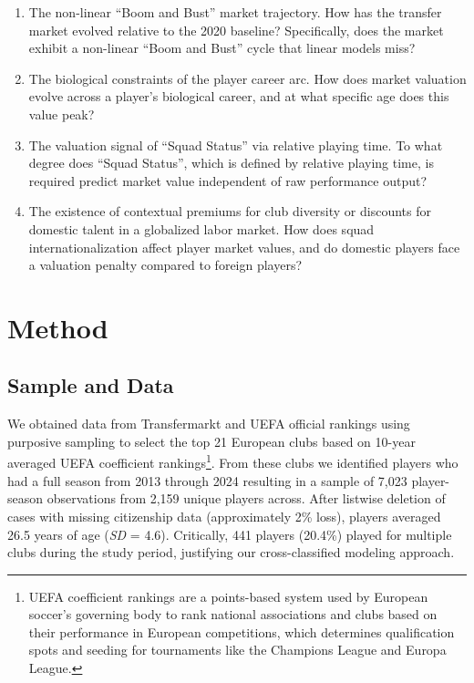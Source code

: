 \documentclass[
  12pt,
]{article}
\providecommand{\tightlist}{%
  \setlength{\itemsep}{0pt}\setlength{\parskip}{0pt}}\usepackage{longtable,booktabs,array}
\begin{document}
\begin{enumerate}
\def\labelenumi{\arabic{enumi}.}
\tightlist
\item
  The non-linear ``Boom and Bust'' market trajectory. How has the
  transfer market evolved relative to the 2020 baseline? Specifically,
  does the market exhibit a non-linear ``Boom and Bust'' cycle that
  linear models miss?
\item
  The biological constraints of the player career arc. How does market
  valuation evolve across a player's biological career, and at what
  specific age does this value peak?
\item
  The valuation signal of ``Squad Status'' via relative playing time. To
  what degree does ``Squad Status'', which is defined by relative
  playing time, is required predict market value independent of raw
  performance output?
\item
  The existence of contextual premiums for club diversity or discounts
  for domestic talent in a globalized labor market. How does squad
  internationalization affect player market values, and do domestic
  players face a valuation penalty compared to foreign players?
\end{enumerate}

\section{Method}\label{method}

\subsection{Sample and Data}\label{sample-and-data}

We obtained data from Transfermarkt and UEFA official rankings using
purposive sampling to select the top 21 European clubs based on 10-year
averaged UEFA coefficient rankings\footnote{UEFA coefficient rankings
  are a points-based system used by European soccer's governing body to
  rank national associations and clubs based on their performance in
  European competitions, which determines qualification spots and
  seeding for tournaments like the Champions League and Europa League.}.
From these clubs we identified players who had a full season from 2013
through 2024 resulting in a sample of 7,023 player-season observations
from 2,159 unique players across. After listwise deletion of cases with
missing citizenship data (approximately 2\% loss), players averaged 26.5
years of age (\emph{SD} = 4.6). Critically, 441 players (20.4\%) played
for multiple clubs during the study period, justifying our
cross-classified modeling approach.
\end{document}
